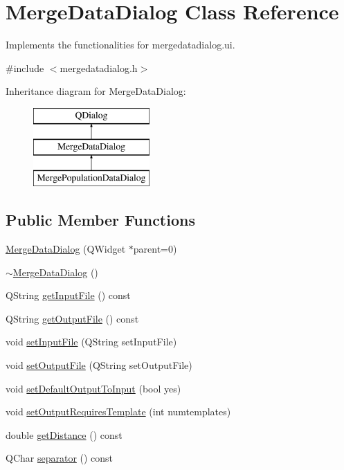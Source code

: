 \hypertarget{class_merge_data_dialog}{}\section{Merge\+Data\+Dialog Class Reference}
\label{class_merge_data_dialog}


Implements the functionalities for mergedatadialog.\+ui.  




{\ttfamily \#include $<$mergedatadialog.\+h$>$}

Inheritance diagram for Merge\+Data\+Dialog\+:\begin{figure}[H]
\begin{center}
\leavevmode
\includegraphics[height=3.000000cm]{da/d1c/class_merge_data_dialog}
\end{center}
\end{figure}
\subsection*{Public Member Functions}
\begin{DoxyCompactItemize}
\item 
\mbox{\hyperlink{class_merge_data_dialog_a73917eefce32e627e8bee559812d1d65}{Merge\+Data\+Dialog}} (Q\+Widget $\ast$parent=0)
\item 
\mbox{\hyperlink{class_merge_data_dialog_af15e839a38e629fc0c6ed829e0b3623c}{$\sim$\+Merge\+Data\+Dialog}} ()
\item 
Q\+String \mbox{\hyperlink{class_merge_data_dialog_a633175ebc86f92e233b6dbf3ff0c35c1}{get\+Input\+File}} () const
\item 
Q\+String \mbox{\hyperlink{class_merge_data_dialog_a7f79670663fe0c0ee77df422b9c8e18b}{get\+Output\+File}} () const
\item 
void \mbox{\hyperlink{class_merge_data_dialog_a34bd5dbabb5f2e691521d465bfbba0d4}{set\+Input\+File}} (Q\+String set\+Input\+File)
\item 
void \mbox{\hyperlink{class_merge_data_dialog_ab31c59b5f2e7b2af01a712b8d65fcc36}{set\+Output\+File}} (Q\+String set\+Output\+File)
\item 
void \mbox{\hyperlink{class_merge_data_dialog_a689b0b761e4abeb94abb73cdb8d48737}{set\+Default\+Output\+To\+Input}} (bool yes)
\item 
void \mbox{\hyperlink{class_merge_data_dialog_a93b71e8d08d45326247c887897ddb2c7}{set\+Output\+Requires\+Template}} (int numtemplates)
\item 
double \mbox{\hyperlink{class_merge_data_dialog_a1038a024df2297dd2767bf541aa15941}{get\+Distance}} () const
\item 
Q\+Char \mbox{\hyperlink{class_merge_data_dialog_a49f50915fbc9a83b4a6e450db036c3d7}{separator}} () const
\end{DoxyCompactItemize}
